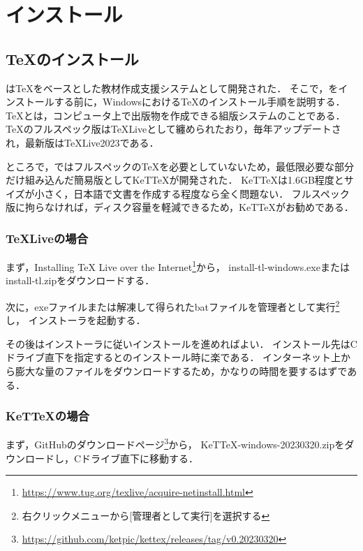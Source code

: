 \addtocounter{page}{-1}

\chapter{インストール}

\section{{\TeX}のインストール}

{\ketcindy}は{\TeX}をベースとした教材作成支援システムとして開発された．
そこで，{\ketcindy}をインストールする前に，Windowsにおける{\TeX}のインストール手順を説明する．
{\TeX}とは，コンピュータ上で出版物を作成できる組版システムのことである．
{\TeX}のフルスペック版は{\TeX}Liveとして纏められたおり，毎年アップデートされ，最新版は{\TeX}Live2023である．

ところで，{\ketcindy}ではフルスペックの{\TeX}を必要としていないため，最低限必要な部分だけ組み込んだ簡易版としてKeT{\TeX}が開発された．
KeT{\TeX}は1.6GB程度とサイズが小さく，日本語で文書を作成する程度なら全く問題ない．
フルスペック版に拘らなければ，ディスク容量を軽減できるため，KeT{\TeX}がお勧めである．

\subsection{{\TeX}Liveの場合}

まず，Installing TeX Live over the Internet\footnote{\url{https://www.tug.org/texlive/acquire-netinstall.html}}から，
install-tl-windows.exeまたはinstall-tl.zipをダウンロードする．

次に，exeファイルまたは解凍して得られたbatファイルを管理者として実行\footnote{右クリックメニューから[管理者として実行]を選択する}し，
インストーラを起動する．

その後はインストーラに従いインストールを進めればよい．
インストール先はCドライブ直下を指定すると{\ketcindy}のインストール時に楽である．
インターネット上から膨大な量のファイルをダウンロードするため，かなりの時間を要するはずである．

\subsection{KeT{\TeX}の場合}

まず，GitHubのダウンロードページ\footnote{\url{https://github.com/ketpic/kettex/releases/tag/v0.20230320}}から，
KeTTeX-windows-20230320.zipをダウンロードし，Cドライブ直下に移動する．

